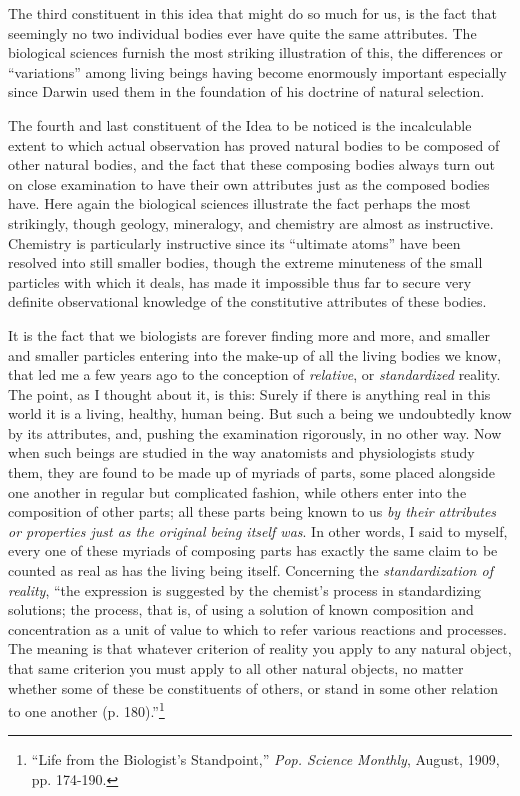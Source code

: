 \documentclass[a4paper, 11pt, oneside, polutonikogreek, english, landscape]{article}
\begin{document}
The third constituent in this idea that might do so much for us, is the fact that seemingly no two individual bodies ever have quite the same attributes. The biological sciences furnish the most striking illustration of this, the differences or ``variations'' among living beings having become enormously important especially since Darwin used them in the foundation of his doctrine of natural selection.

The fourth and last constituent of the Idea to be noticed is the incalculable extent to which actual observation has proved natural bodies to be composed of other natural bodies, and the fact that these composing bodies always turn out on close examination to have their own attributes just as the composed bodies have. Here again the biological sciences illustrate the fact perhaps the most strikingly, though geology, mineralogy, and chemistry are almost as instructive. Chemistry is particularly instructive since its ``ultimate atoms'' have been resolved into still smaller bodies, though the extreme minuteness of the small particles with which it deals, has made it impossible thus far to secure very definite observational knowledge of the constitutive attributes of these bodies.

It is the fact that we biologists are forever finding more and more, and smaller and smaller particles entering into the make-up of all the living bodies we know, that led me a few years ago to the conception of \emph{relative}, or \emph{standardized} reality. The point, as I thought about it, is this: Surely if there is anything real in this world it is a living, healthy, human being. But such a being we undoubtedly know by its attributes, and, pushing the examination rigorously, in no other way. Now when such beings are studied in the way anatomists and physiologists study them, they are found to be made up of myriads of parts, some placed alongside one another in regular but complicated fashion, while others enter into the composition of other parts; all these parts being known to us \emph{by their attributes or properties just as the original being itself was}. In other words, I said to myself, every one of these myriads of composing parts has exactly the same claim to be counted as real as has the living being itself. Concerning the \emph{standardization of reality}, ``the expression is suggested by the chemist's process in standardizing solutions; the process, that is, of using a solution of known composition and concentration as a unit of value to which to refer various reactions and processes. The meaning is that whatever criterion of reality you apply to any natural object, that same criterion you must apply to all other natural objects, no matter whether some of these be constituents of others, or stand in some other relation to one another (p. 180).''\footnote{``Life from the Biologist's Standpoint,'' \emph{Pop. Science Monthly}, August, 1909, pp. 174-190.}
\end{document}
